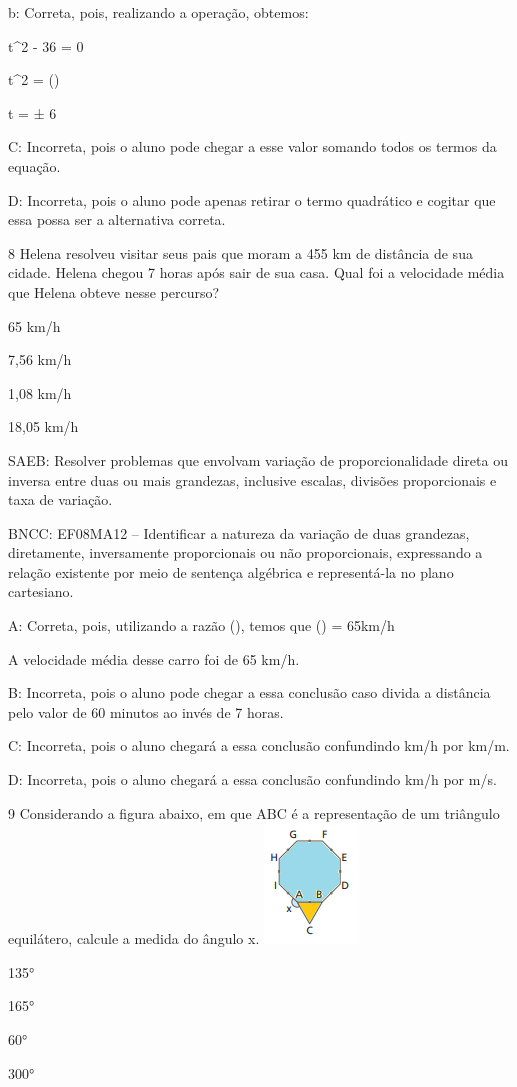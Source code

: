{b: Correta, pois, realizando a operação, obtemos:

t^2 - 36 = 0

t^2 = ()

t = ± 6

C: Incorreta, pois o aluno pode chegar a esse valor somando todos os
termos da equação.

D: Incorreta, pois o aluno pode apenas retirar o termo quadrático e
cogitar que essa possa ser a alternativa correta.

\num{8} Helena resolveu visitar seus pais que moram a 455 km de distância de
sua cidade. Helena chegou 7 horas após sair de sua casa. Qual foi a
velocidade média que Helena obteve nesse percurso?
\item 65 km/h
\item 7,56 km/h
\item 1,08 km/h
\item 18,05 km/h

SAEB: Resolver problemas que envolvam variação de proporcionalidade
direta ou inversa entre duas ou mais grandezas, inclusive escalas,
divisões proporcionais e taxa de variação.

BNCC: EF08MA12 -- Identificar a natureza da variação de duas grandezas,
diretamente, inversamente proporcionais ou não proporcionais,
expressando a relação existente por meio de sentença algébrica e
representá-la no plano cartesiano.

A: Correta, pois, utilizando a razão (),
temos que () = 65km/h

A velocidade média desse carro foi de 65 km/h.

B: Incorreta, pois o aluno pode chegar a essa conclusão caso divida a
distância pelo valor de 60 minutos ao invés de 7 horas.

C: Incorreta, pois o aluno chegará a essa conclusão confundindo km/h por
km/m.

D: Incorreta, pois o aluno chegará a essa conclusão confundindo km/h por
m/s.

\num{9} Considerando a figura abaixo, em que ABC é a representação de um
triângulo equilátero, calcule a medida do ângulo x.
\includegraphics[width=0.98958in,height=1.26042in]{./imgSAEB_8_MAT/media/image56.png}
\item 135°
\item 165°
\item 60°
\item 300°

}
